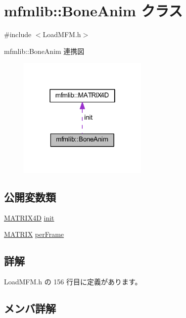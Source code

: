 \hypertarget{classmfmlib_1_1_bone_anim}{}\section{mfmlib\+:\+:Bone\+Anim クラス}
\label{classmfmlib_1_1_bone_anim}


{\ttfamily \#include $<$Load\+M\+F\+M.\+h$>$}



mfmlib\+:\+:Bone\+Anim 連携図\nopagebreak
\begin{figure}[H]
\begin{center}
\leavevmode
\includegraphics[width=178pt]{classmfmlib_1_1_bone_anim__coll__graph}
\end{center}
\end{figure}
\subsection*{公開変数類}
\begin{DoxyCompactItemize}
\item 
\mbox{\hyperlink{structmfmlib_1_1_m_a_t_r_i_x4_d}{M\+A\+T\+R\+I\+X4D}} \mbox{\hyperlink{classmfmlib_1_1_bone_anim_a3c1f11f8db6142d65714e43d64b15d58}{init}}
\item 
\mbox{\hyperlink{classmfmlib_1_1_m_a_t_r_i_x}{M\+A\+T\+R\+IX}} \mbox{\hyperlink{classmfmlib_1_1_bone_anim_a31647fc544d8e6878209274519344ff3}{per\+Frame}}
\end{DoxyCompactItemize}


\subsection{詳解}


 Load\+M\+F\+M.\+h の 156 行目に定義があります。



\subsection{メンバ詳解}
\mbox{\label{classmfmlib_1_1_bone_anim_a3c1f11f8db6142d65714e43d64b15d58}} 
